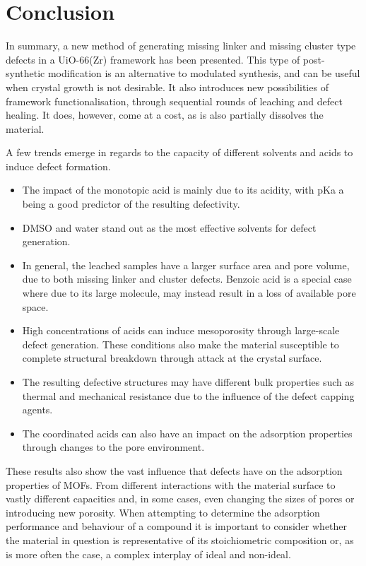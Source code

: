 
\FloatBarrier%
\pagebreak

\section{Conclusion}

In summary, a new method of generating missing linker and missing
cluster type defects in a UiO-66(Zr) framework has been presented.
This type of post-synthetic modification is an alternative to 
modulated synthesis, and can be useful when crystal growth is
not desirable. It also introduces new possibilities of framework
functionalisation, through sequential rounds of leaching and 
defect healing. It does, however, come at a cost, as is also 
partially dissolves the material.

A few trends emerge in regards to the capacity of different solvents 
and acids to induce defect formation.

\begin{itemize}
    \item The impact of the monotopic acid is mainly due to its 
    acidity, with pKa a being a good predictor of the 
    resulting defectivity.
    \item DMSO and water stand out as the most effective solvents
    for defect generation.
    \item In general, the leached samples have a larger surface 
    area and pore volume, due to both missing linker and cluster
    defects. Benzoic acid is a special case where 
    due to its large molecule, may instead result in a loss of
    available pore space.
    \item High concentrations of acids can induce mesoporosity
    through large-scale defect generation. These conditions also
    make the material susceptible to complete 
    structural breakdown through attack at the crystal surface.
    \item The resulting defective structures may have different 
    bulk properties such as thermal and mechanical resistance due 
    to the influence of the defect capping agents.
    \item The coordinated acids can also have an impact on the
    adsorption properties through changes to the pore environment.

\end{itemize}

These results also show the vast influence that defects have on the 
adsorption properties of MOFs. From different interactions with 
the material surface to vastly different capacities and, in some 
cases, even changing the sizes of pores or introducing new porosity.
When attempting to determine the adsorption performance and behaviour
of a compound it is important to consider whether the material in 
question is representative of its stoichiometric composition or,
as is more often the case, a complex interplay of ideal and non-ideal.

\pagebreak